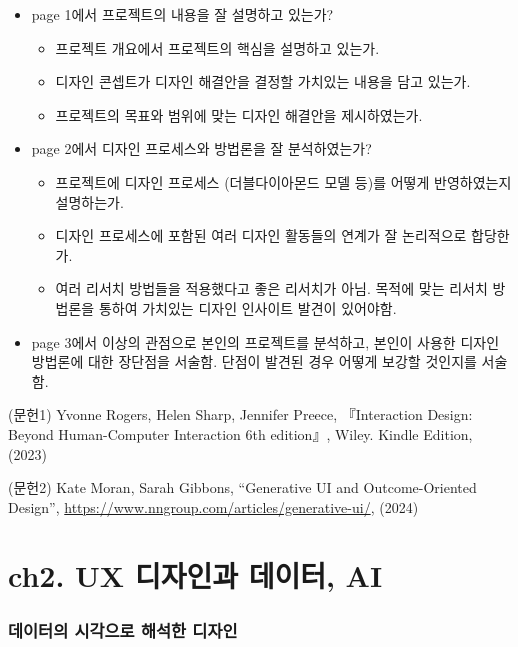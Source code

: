 \documentclass[
  letterpaper,
]{book}
\providecommand{\tightlist}{%
  \setlength{\itemsep}{0pt}\setlength{\parskip}{0pt}}\usepackage{longtable,booktabs,array}
\begin{document}
\begin{itemize}
\tightlist
\item
  page 1에서 프로젝트의 내용을 잘 설명하고 있는가?

  \begin{itemize}
  \tightlist
  \item
    프로젝트 개요에서 프로젝트의 핵심을 설명하고 있는가.
  \item
    디자인 콘셉트가 디자인 해결안을 결정할 가치있는 내용을 담고 있는가.
  \item
    프로젝트의 목표와 범위에 맞는 디자인 해결안을 제시하였는가.
  \end{itemize}
\item
  page 2에서 디자인 프로세스와 방법론을 잘 분석하였는가?

  \begin{itemize}
  \tightlist
  \item
    프로젝트에 디자인 프로세스 (더블다이아몬드 모델 등)를 어떻게
    반영하였는지 설명하는가.
  \item
    디자인 프로세스에 포함된 여러 디자인 활동들의 연계가 잘 논리적으로
    합당한가.
  \item
    여러 리서치 방법들을 적용했다고 좋은 리서치가 아님. 목적에 맞는
    리서치 방법론을 통하여 가치있는 디자인 인사이트 발견이 있어야함.
  \end{itemize}
\item
  page 3에서 이상의 관점으로 본인의 프로젝트를 분석하고, 본인이 사용한
  디자인 방법론에 대한 장단점을 서술함. 단점이 발견된 경우 어떻게 보강할
  것인지를 서술함.
\end{itemize}

(문헌1) Yvonne Rogers, Helen Sharp, Jennifer Preece, 『Interaction
Design: Beyond Human-Computer Interaction 6th edition』, Wiley. Kindle
Edition, (2023)

(문헌2) Kate Moran, Sarah Gibbons, ``Generative UI and Outcome-Oriented
Design'', \url{https://www.nngroup.com/articles/generative-ui/}, (2024)

\chapter{ch2. UX 디자인과 데이터,
AI}\label{ch2.-ux-uxb514uxc790uxc778uxacfc-uxb370uxc774uxd130-ai}

\subsection{데이터의 시각으로 해석한
디자인}\label{uxb370uxc774uxd130uxc758-uxc2dcuxac01uxc73cuxb85c-uxd574uxc11duxd55c-uxb514uxc790uxc778}
\end{document}
